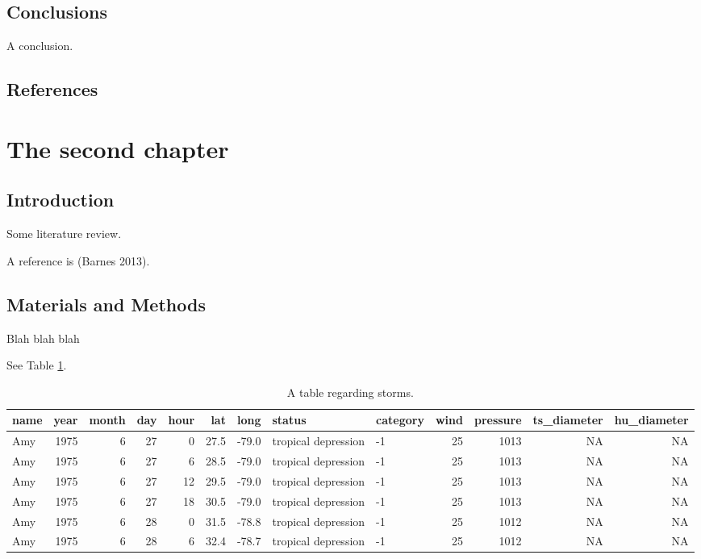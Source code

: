 \documentclass[
]{article}
\begin{document}
\hypertarget{conclusions}{%
\subsection{Conclusions}\label{conclusions}}

A conclusion.

\hypertarget{references}{%
\subsection{References}\label{references}}

\clearpage

\hypertarget{the-second-chapter}{%
\section{The second chapter}\label{the-second-chapter}}

\hypertarget{introduction-1}{%
\subsection{Introduction}\label{introduction-1}}

Some literature review.

A reference is (Barnes 2013).

\hypertarget{materials-and-methods-1}{%
\subsection{Materials and Methods}\label{materials-and-methods-1}}

Blah blah blah

See Table \ref{tab:ch-2-table}.

\begin{table}

\caption{\label{tab:ch-2-table}A table regarding storms.}
\centering
\begin{tabular}[t]{l|r|r|r|r|r|r|l|l|r|r|r|r}
\hline
name & year & month & day & hour & lat & long & status & category & wind & pressure & ts\_diameter & hu\_diameter\\
\hline
Amy & 1975 & 6 & 27 & 0 & 27.5 & -79.0 & tropical depression & -1 & 25 & 1013 & NA & NA\\
\hline
Amy & 1975 & 6 & 27 & 6 & 28.5 & -79.0 & tropical depression & -1 & 25 & 1013 & NA & NA\\
\hline
Amy & 1975 & 6 & 27 & 12 & 29.5 & -79.0 & tropical depression & -1 & 25 & 1013 & NA & NA\\
\hline
Amy & 1975 & 6 & 27 & 18 & 30.5 & -79.0 & tropical depression & -1 & 25 & 1013 & NA & NA\\
\hline
Amy & 1975 & 6 & 28 & 0 & 31.5 & -78.8 & tropical depression & -1 & 25 & 1012 & NA & NA\\
\hline
Amy & 1975 & 6 & 28 & 6 & 32.4 & -78.7 & tropical depression & -1 & 25 & 1012 & NA & NA\\
\hline
\end{tabular}
\end{table}
\end{document}
